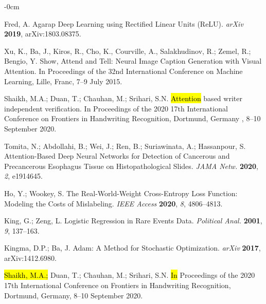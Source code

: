 \documentclass[sensors,article,accept,pdftex,moreauthors]{Definitions/mdpi}
\begin{document}
\begin{adjustwidth}{-\extralength}{0cm}
\begin{thebibliography}{999}
Fred, A. Agarap Deep Learning using Rectified Linear Units (ReLU).
{\em arXiv} 
{\bf 2019}, arXiv:1803.08375.

Xu, K., Ba, J., Kiros, R., Cho, K., Courville, A., Salakhudinov, R.; Zemel, R.; Bengio, Y. Show, Attend and Tell: Neural Image Caption Generation with Visual Attention. In Proceedings of the 32nd International Conference on Machine Learning, Lille, Franc, 7--9 July 2015.

Shaikh, M.A.; Duan, T.; Chauhan, M.; Srihari, S.N. \hl{Attention} %
 based writer independent verification. In Proceedings of the 2020 17th International Conference on Frontiers in Handwriting Recognition,  Dortmund, Germany , 8--10 September
{2020}.

Tomita, N.; Abdollahi, B.; Wei, J.; Ren, B.; Suriawinata, A.; Hassanpour, S. Attention-Based Deep Neural Networks for Detection of Cancerous and Precancerous Esophagus Tissue on Histopathological Slides.
{\em JAMA Netw.} 
{\bf 2020}, \emph{2}, e1914645.

Ho, Y.; Wookey, S. The Real-World-Weight Cross-Entropy Loss Function: Modeling the Costs of Mislabeling.
\emph{IEEE Access }
{\bf 2020}, \emph{8}, 4806--4813.

King, G.; Zeng, L. Logistic Regression in Rare Events Data.
{\em Political Anal.} 
{\bf 2001}, \emph{9}, 137--163.

Kingma, D.P.; Ba, J. Adam: A Method for Stochastic Optimization.
{\em arXiv} 
{\bf 2017}, arXiv:1412.6980.

\hl{Shaikh, M.A.;} %
 Duan, T.; Chauhan, M.; Srihari, S.N. \hl{In} %
 Proceedings of the 2020 17th International Conference on Frontiers in Handwriting Recognition, Dortmund, Germany, 8--10 September 2020.




		\end{thebibliography}
		

\end{adjustwidth}
\end{document}
